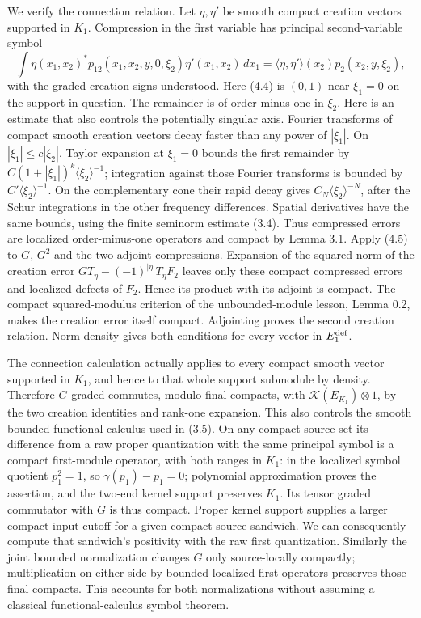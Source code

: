\documentclass[
  11pt,
]{article}
\begin{document}
We verify the connection relation. Let \(\eta,\eta'\) be smooth compact
creation vectors supported in \(K_1\). Compression in the first variable
has principal second-variable symbol \[
 \int \eta(x_1,x_2)^*p_{12}(x_1,x_2,y,0,\xi_2)
                    \eta'(x_1,x_2)\,dx_1
 =\langle\eta,\eta'\rangle(x_2)p_2(x_2,y,\xi_2),
 \tag{4.5}
\] with the graded creation signs understood. Here (4.4) is \((0,1)\)
near \(\xi_1=0\) on the support in question. The remainder is of order
minus one in \(\xi_2\). Here is an estimate that also controls the
potentially singular axis. Fourier transforms of compact smooth creation
vectors decay faster than any power of \(|\xi_1|\). On
\(|\xi_1|\leq c|\xi_2|\), Taylor expansion at \(\xi_1=0\) bounds the
first remainder by \(C(1+|\xi_1|)^k\langle\xi_2\rangle^{-1}\);
integration against those Fourier transforms is bounded by
\(C'\langle\xi_2\rangle^{-1}\). On the complementary cone their rapid
decay gives \(C_N\langle\xi_2\rangle^{-N}\), after the Schur
integrations in the other frequency differences. Spatial derivatives
have the same bounds, using the finite seminorm estimate (3.4). Thus
compressed errors are localized order-minus-one operators and compact by
Lemma 3.1. Apply (4.5) to \(G\), \(G^2\) and the two adjoint
compressions. Expansion of the squared norm of the creation error
\(GT_\eta-(-1)^{|\eta|}T_\eta F_2\) leaves only these compact compressed
errors and localized defects of \(F_2\). Hence its product with its
adjoint is compact. The compact squared-modulus criterion of the
unbounded-module lesson, Lemma 0.2, makes the creation error itself
compact. Adjointing proves the second creation relation. Norm density
gives both conditions for every vector in \(E_1^{\rm def}\).

The connection calculation actually applies to every compact smooth
vector supported in \(K_1\), and hence to that whole support submodule
by density. Therefore \(G\) graded commutes, modulo final compacts, with
\(\mathcal K(E_{K_1})\otimes1\), by the two creation identities and
rank-one expansion. This also controls the smooth bounded functional
calculus used in (3.5). On any compact source set its difference from a
raw proper quantization with the same principal symbol is a compact
first-module operator, with both ranges in \(K_1\): in the localized
symbol quotient \(p_1^2=1\), so \(\gamma(p_1)-p_1=0\); polynomial
approximation proves the assertion, and the two-end kernel support
preserves \(K_1\). Its tensor graded commutator with \(G\) is thus
compact. Proper kernel support supplies a larger compact input cutoff
for a given compact source sandwich. We can consequently compute that
sandwich's positivity with the raw first quantization. Similarly the
joint bounded normalization changes \(G\) only source-locally compactly;
multiplication on either side by bounded localized first operators
preserves those final compacts. This accounts for both normalizations
without assuming a classical functional-calculus symbol theorem.
\end{document}
